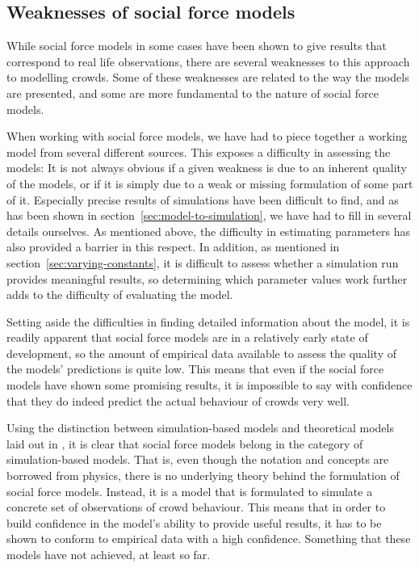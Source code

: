 \subsection{Weaknesses of social force models}
While social force models in some cases have been shown to give results that 
correspond to real life observations, there are several weaknesses to this 
approach to modelling crowds. Some of these weaknesses are related to the way 
the models are presented, and some are more fundamental to the nature of 
social force models.

When working with social force models, we have had to piece together a working 
model from several different sources. This exposes a difficulty in assessing 
the models: It is not always obvious if a given weakness is due to an inherent 
quality of the models, or if it is simply due to a weak or missing formulation 
of some part of it. Especially precise results of simulations have been 
difficult to find, and as has been shown in 
section~\ref{sec:model-to-simulation}, we have had to fill in several details 
ourselves. As mentioned above, the difficulty in estimating parameters has 
also provided a barrier in this respect. In addition, as mentioned in 
section~\ref{sec:varying-constants}, it is difficult to assess whether a 
simulation run provides meaningful results, so determining which parameter 
values work further adds to the difficulty of evaluating the model.

Setting aside the difficulties in finding detailed information about the 
model, it is readily apparent that social force models are in a relatively 
early state of development, so the amount of empirical data available to 
assess the quality of the models' predictions is quite low. This means that 
even if the social force models have shown some promising results, it is 
impossible to say with confidence that they do indeed predict the actual 
behaviour of crowds very well.

Using the distinction between simulation-based models and theoretical models 
laid out in \cite{imfufa-tekst}, it is clear that social force models belong 
in the category of simulation-based models. That is, even though the notation 
and concepts are borrowed from physics, there is no underlying theory behind 
the formulation of social force models. Instead, it is a model that is 
formulated to simulate a concrete set of observations of crowd behaviour. This 
means that in order to build confidence in the model's ability to provide 
useful results, it has to be shown to conform to empirical data with a high 
confidence. Something that these models have not achieved, at least so far.


